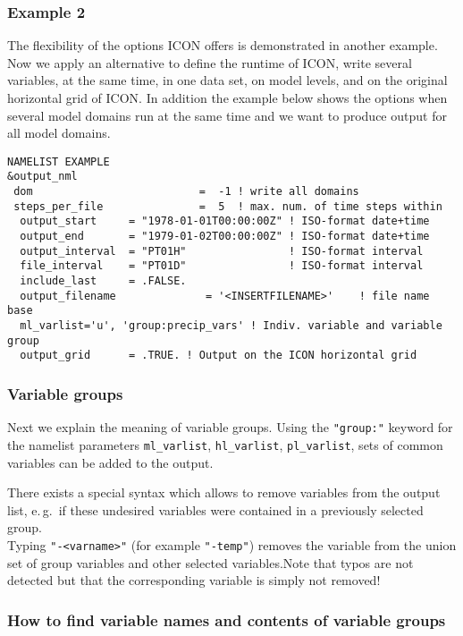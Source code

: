 \subsubsection{Example 2}

The flexibility of the options ICON offers is demonstrated in another example. Now we apply an alternative to define the runtime of ICON, write several variables, at the same time, in one data set, on model levels, and on the original horizontal grid of ICON. In addition the example below shows the options when several model domains run at the same time and we want to produce output for all model domains.

\begin{Verbatim}[frame=single]
NAMELIST EXAMPLE
&output_nml
 dom                          =  -1 ! write all domains
 steps_per_file               =  5  ! max. num. of time steps within
  output_start     = "1978-01-01T00:00:00Z" ! ISO-format date+time
  output_end       = "1979-01-02T00:00:00Z" ! ISO-format date+time
  output_interval  = "PT01H"                ! ISO-format interval
  file_interval    = "PT01D"                ! ISO-format interval
  include_last     = .FALSE.
  output_filename              = '<INSERTFILENAME>'    ! file name base
  ml_varlist='u', 'group:precip_vars' ! Indiv. variable and variable group
  output_grid      = .TRUE. ! Output on the ICON horizontal grid
\end{Verbatim}

\subsubsection{Variable groups}
Next we explain the meaning of variable groups.
Using the \texttt{"group:"} keyword for the namelist parameters \texttt{ml\_varlist}, \texttt{hl\_varlist}, \texttt{pl\_varlist},
sets of common variables can be added to the output.


There exists a special syntax which allows to remove variables from the output list, e.\,g.\ if
these undesired variables were contained in a previously selected group.\\
Typing \texttt{"-<varname>"} (for example \texttt{"-temp"}) removes the
variable from the union set of group variables and other selected variables.Note that typos are not detected but that the corresponding variable is simply not removed!



\subsubsection{How to find variable names and contents of variable groups}

